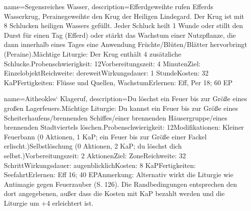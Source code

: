 {
    name={Segensreiches Wasser},
    description={Efferdgeweihte rufen Efferds Wasserkrug, Perainegeweihte den Krug der Heiligen Lindegard. Der Krug ist mit 8 Schlucken heiligen Wassers gefüllt. Jeder Schluck heilt 1 Wunde oder stillt den Durst für einen Tag (Efferd) oder stärkt das Wachstum einer Nutzpflanze, die dann innerhalb eines Tages eine Anwendung Früchte/Blüten/Blätter hervorbringt (Peraine).\newline Mächtige Liturgie: Der Krug enthält 4 zusätzliche Schlucke.\newline Probenschwierigkeit: 12\newline Vorbereitungszeit: 4 Minuten\newline Ziel: Einzelobjekt\newline Reichweite: dereweit\newline Wirkungsdauer: 1 Stunde\newline Kosten: 32 KaP\newline Fertigkeiten: Flüsse und Quellen, Wachstum\newline Erlernen: Eff, Per 18; 60 EP}
}


{
    name={Aitheokles‘ Klageruf},
    description={Du löschst ein Feuer bis zur Größe eines großen Lagerfeuers.\newline Mächtige Liturgie: Du kannst ein Feuer bis zur Größe eines Scheiterhaufens/brennenden Schiffes/einer brennenden Häusergruppe/eines brennenden Stadtviertels löschen.\newline Probenschwierigkeit: 12\newline Modifikationen: Kleiner Feuerbann (0 Aktionen, 1 KaP; ein Feuer bis zur Größe einer Fackel erlischt.)\newline Selbstlöschung (0 Aktionen, 2 KaP; du löschst dich selbst.)\newline Vorbereitungszeit: 2 Aktionen\newline Ziel: Zone\newline Reichweite: 32 Schritt\newline Wirkungsdauer: augenblicklich\newline Kosten: 8 KaP\newline Fertigkeiten: Seefahrt\newline Erlernen: Eff 16; 40 EP\newline Anmerkung: Alternativ wirkt die Liturgie wie Antimagie gegen Feuerzauber (S. 126). Die Randbedingungen entsprechen den dort angegebenen, außer dass die Kosten mit KaP bezahlt werden und die Liturgie um +4 erleichtert ist.}
}


